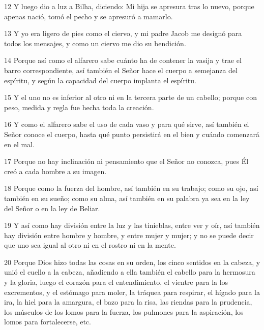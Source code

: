 \par 12 Y luego dio a luz a Bilha, diciendo: Mi hija se apresura tras lo nuevo, porque apenas nació, tomó el pecho y se apresuró a mamarlo.

\par 13 Y yo era ligero de pies como el ciervo, y mi padre Jacob me designó para todos los mensajes, y como un ciervo me dio su bendición.

\par 14 Porque así como el alfarero sabe cuánto ha de contener la vasija y trae el barro correspondiente, así también el Señor hace el cuerpo a semejanza del espíritu, y según la capacidad del cuerpo implanta el espíritu.

\par 15 Y el uno no es inferior al otro ni en la tercera parte de un cabello; porque con peso, medida y regla fue hecha toda la creación.

\par 16 Y como el alfarero sabe el uso de cada vaso y para qué sirve, así también el Señor conoce el cuerpo, hasta qué punto persistirá en el bien y cuándo comenzará en el mal.

\par 17 Porque no hay inclinación ni pensamiento que el Señor no conozca, pues Él creó a cada hombre a su imagen.

\par 18 Porque como la fuerza del hombre, así también en su trabajo; como su ojo, así también en su sueño; como su alma, así también en su palabra ya sea en la ley del Señor o en la ley de Beliar.

\par 19 Y así como hay división entre la luz y las tinieblas, entre ver y oír, así también hay división entre hombre y hombre, y entre mujer y mujer; y no se puede decir que uno sea igual al otro ni en el rostro ni en la mente.

\par 20 Porque Dios hizo todas las cosas en su orden, los cinco sentidos en la cabeza, y unió el cuello a la cabeza, añadiendo a ella también el cabello para la hermosura y la gloria, luego el corazón para el entendimiento, el vientre para la los excrementos, y el estómago para moler, la tráquea para respirar, el hígado para la ira, la hiel para la amargura, el bazo para la risa, las riendas para la prudencia, los músculos de los lomos para la fuerza, los pulmones para la aspiración, los lomos para fortalecerse, etc.


